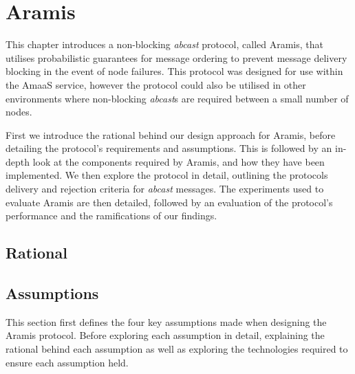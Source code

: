 \chapter{Aramis}

    \graphicspath{{Chapter4-Aramis/Figs/Vector/}{Chapter4-Aramis/Figs/}}

This chapter introduces a non-blocking \emph{abcast} protocol, called \textsf{Aramis}, that utilises probabilistic guarantees for message ordering to prevent message delivery blocking in the event of node failures.  This protocol was designed for use within the \textsf{AmaaS} service, however the protocol could also be utilised in other environments where non-blocking \emph{abcast}s are required between a small number of nodes.  

First we introduce the rational behind our design approach for \textsf{Aramis}, before detailing the protocol's requirements and assumptions.  This is followed by an in-depth look at the components required by \textsf{Aramis}, and how they have been implemented.  We then explore the protocol in detail, outlining the protocols delivery and rejection criteria for \emph{abcast} messages.  The experiments used to evaluate \textsf{Aramis} are then detailed, followed by an evaluation of the protocol's performance and the ramifications of our findings.  

\section{Rational}
	
	
\newpage
\section{Assumptions}
	This section first defines the four key assumptions made when designing the \textsf{Aramis} protocol.  Before exploring each assumption in detail, explaining the rational behind each assumption as well as exploring the technologies required to ensure each assumption held.  


